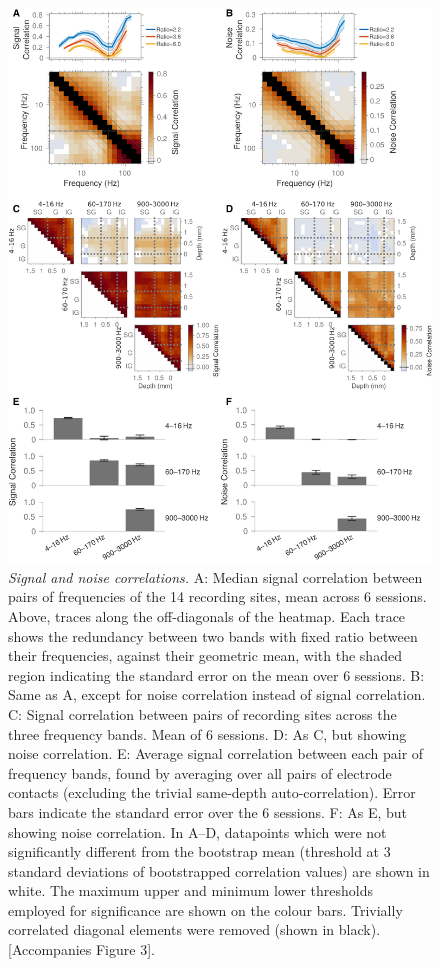 \begin{figure}
\centering \includegraphics[width=\columnwidth]{paperfigs/figS3}
%
\caption{%
\textit{Signal and noise correlations.}
A: Median signal correlation between pairs of frequencies of the 14 recording sites, mean across 6 sessions.
Above, traces along the off-diagonals of the heatmap.
Each trace shows the redundancy between two bands with fixed ratio between their frequencies, against their geometric mean, with the shaded region indicating the standard error on the mean over 6 sessions.
B: Same as A, except for noise correlation instead of signal correlation.
C: Signal correlation between pairs of recording sites across the three frequency bands.
Mean of 6 sessions.
D: As C, but showing noise correlation.
E: Average signal correlation between each pair of frequency bands, found by averaging over all pairs of electrode contacts (excluding the trivial same-depth auto-correlation).
Error bars indicate the standard error over the 6 sessions.
F: As E, but showing noise correlation.
In A--D, datapoints which were not significantly different from the bootstrap mean (threshold at 3 standard deviations of bootstrapped correlation values) are shown in white.
The maximum upper and minimum lower thresholds employed for significance are shown on the colour bars.
Trivially correlated diagonal elements were removed (shown in black).
[Accompanies Figure 3].
}
\label{fig:lam_s3}
%
\end{figure}


